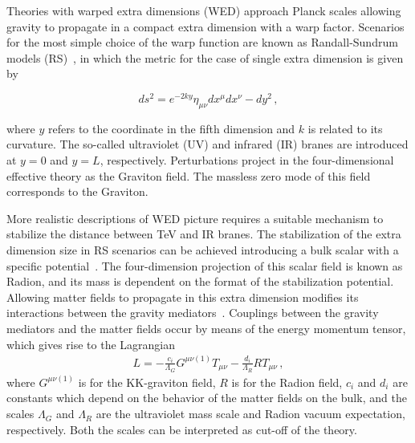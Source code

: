 Theories with warped extra dimensions (WED) approach Planck scales allowing gravity 
to propagate in a compact extra dimension with a warp factor.
Scenarios for the most simple choice of the warp function are known as Randall-Sundrum models
(RS)~\cite{Randall:1999ee}, in which the metric for the case of single extra dimension is given by

\begin{equation}
ds^2 =  e^{- 2 k y}  \eta_{\mu\nu} dx^\mu dx^\nu - dy^2 \,,
\label{expky}
\end{equation}

where $y$ refers to the coordinate in the fifth dimension and $k$ is related to its curvature.
The so-called ultraviolet (UV) and infrared (IR) branes are introduced at $y=0$ and $y=L$,
respectively.
Perturbations project in the four-dimensional effective theory
as the Graviton field. The massless zero mode of this field corresponds to the Graviton.

More realistic descriptions of WED picture requires a suitable mechanism to stabilize the
distance between TeV and IR branes.
The stabilization of the extra dimension size in RS scenarios can be achieved introducing a bulk scalar
with a specific potential~\cite{Goldberger:1999uk}.
The four-dimension projection of this scalar field is known as Radion, 
and its mass is dependent on the format of the stabilization potential. %
Allowing matter fields to propagate in this extra dimension modifies its interactions between the gravity mediators~\cite{Gherghetta:2010cj}. 
Couplings between the gravity mediators and the matter fields occur by means of the
energy momentum tensor, which gives rise to the Lagrangian~\cite{Giudice:1998ck,Csaki:2000zn}
\begin{eqnarray}
L = - \frac{c_i}{\Lambda_G}  G^{\mu\nu(1)} T_{\mu\nu}
- \frac{d_i}{\Lambda_{R}}  R T_{\mu\nu} \,,
\label{eq:wed_lagrangian}
\end{eqnarray}
where $G^{\mu\nu(1)}$ is for the KK-graviton field, $R$ is for the Radion field,
$c_i$ and $d_i$ are constants which depend on the behavior of the matter fields on the bulk, and
the scales $\Lambda_G$ and $\Lambda_R$ are the ultraviolet mass scale and Radion vacuum expectation,
respectively. Both the scales can be interpreted as cut-off of the theory.

